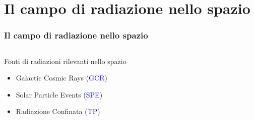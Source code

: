 \documentclass[9pt]{beamer}
\begin{document}
\section{Il campo di radiazione nello spazio}
\begin{frame} [fragile]
\small
	\frametitle{Il campo di radiazione nello spazio}
	\begin{columns}
  \begin{column}{0.50\textwidth}
 
 \begin{block}{Fonti di radiazioni rilevanti nello spazio}
    \begin{itemize}
\item Galactic Cosmic Rays (\textcolor{blue}{GCR})
\item Solar Particle Events (\textcolor{blue}{SPE})
\item Radiazione Confinata (\textcolor{blue}{TP})
\end{itemize}
\end{block}



\end{column}
\end{columns}
\end{frame}
\end{document}
